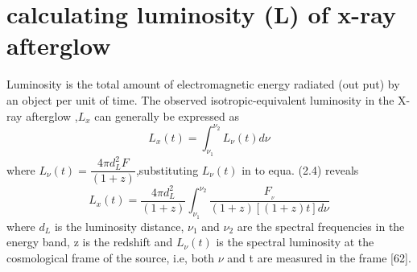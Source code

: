 \section{calculating luminosity (L) of x-ray afterglow}
Luminosity is the total amount of electromagnetic energy radiated (out put) by an  object per unit of time. The observed isotropic-equivalent luminosity in the X-ray afterglow ,$ L_{x} $ can generally be expressed as 
\begin{equation}
L_{x}(t)= \int_{\nu_{1}}^{\nu_{2}} L_{\nu}(t)d\nu
\end{equation}
 where $ L_{\nu}(t)=\dfrac{4 \pi d_{L}^{2} F} {(1+z)} $,substituting  $L_{\nu}(t)$ in to equa. (2.4) reveals 
 \begin{equation}
 L_{x}(t)=\dfrac{4 \pi d_{L}^{2}} {(1+z)}\int_{\nu_{1}}^{\nu_{2}}\frac{F_{_{\nu}}}{(1+z)[(1+z)t]d\nu} 
 \end{equation}
where $ d_{L} $ is the luminosity distance, $\nu_{1}$  and $ \nu_{2} $ are the spectral frequencies in the energy band, z is the redshift and $ L_{\nu}  (t) $ is the spectral luminosity at the cosmological frame of the source, i.e, both $\nu $ and t are  measured in the frame [62].
